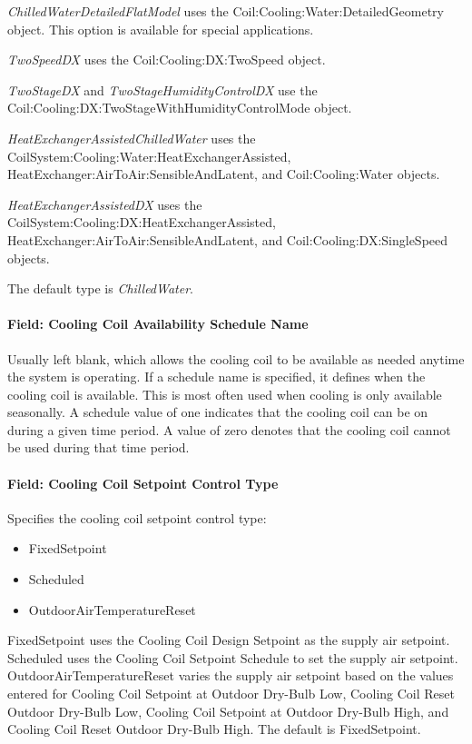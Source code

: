 \emph{ChilledWaterDetailedFlatModel} uses the Coil:Cooling:Water:DetailedGeometry object. This option is available for special applications.

\emph{TwoSpeedDX} uses the Coil:Cooling:DX:TwoSpeed object.

\emph{TwoStageDX} and \emph{TwoStageHumidityControlDX} use the Coil:Cooling:DX:TwoStageWithHumidityControlMode object.

\emph{HeatExchangerAssistedChilledWater} uses the CoilSystem:Cooling:Water:HeatExchangerAssisted, HeatExchanger:AirToAir:SensibleAndLatent, and Coil:Cooling:Water objects.

\emph{HeatExchangerAssistedDX} uses the CoilSystem:Cooling:DX:HeatExchangerAssisted, HeatExchanger:AirToAir:SensibleAndLatent, and Coil:Cooling:DX:SingleSpeed objects.

The default type is \emph{ChilledWater}.

\paragraph{Field: Cooling Coil Availability Schedule Name}\label{field-cooling-coil-availability-schedule-name-11}

Usually left blank, which allows the cooling coil to be available as needed anytime the system is operating. If a schedule name is specified, it defines when the cooling coil is available. This is most often used when cooling is only available seasonally. A schedule value of one indicates that the cooling coil can be on during a given time period. A value of zero denotes that the cooling coil cannot be used during that time period.

\paragraph{Field: Cooling Coil Setpoint Control Type}\label{field-cooling-coil-setpoint-control-type-2}

Specifies the cooling coil setpoint control type:

\begin{itemize}
\item
  FixedSetpoint
\item
  Scheduled
\item
  OutdoorAirTemperatureReset
\end{itemize}

FixedSetpoint uses the Cooling Coil Design Setpoint as the supply air setpoint. Scheduled uses the Cooling Coil Setpoint Schedule to set the supply air setpoint. OutdoorAirTemperatureReset varies the supply air setpoint based on the values entered for Cooling Coil Setpoint at Outdoor Dry-Bulb Low, Cooling Coil Reset Outdoor Dry-Bulb Low, Cooling Coil Setpoint at Outdoor Dry-Bulb High, and Cooling Coil Reset Outdoor Dry-Bulb High. The default is FixedSetpoint.

